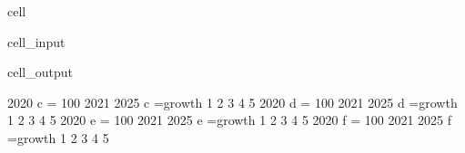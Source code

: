 \documentclass[letterpaper,10pt,english]{jupyterBook}
\begin{document}
\begin{sphinxuseclass}{cell}\begin{sphinxVerbatimInput}

\begin{sphinxuseclass}{cell_input}
\begin{sphinxVerbatim}[commandchars=\\\{\}]
                                 
 \PYG{p}{[}
        \PYG{p}{]}
\end{sphinxVerbatim}

\end{sphinxuseclass}\end{sphinxVerbatimInput}
\begin{sphinxVerbatimOutput}

\begin{sphinxuseclass}{cell_output}
\begin{sphinxVerbatim}[commandchars=\\\{\}]
\PYGZlt{}2020     \PYGZgt{} c = 100 
      \PYGZlt{}2021 2025\PYGZgt{} c =growth 1 2 3 4 5
\PYGZlt{}2020     \PYGZgt{} d = 100 
      \PYGZlt{}2021 2025\PYGZgt{} d =growth 1 2 3 4 5
\PYGZlt{}2020     \PYGZgt{} e = 100 
      \PYGZlt{}2021 2025\PYGZgt{} e =growth 1 2 3 4 5
\PYGZlt{}2020     \PYGZgt{} f = 100 
      \PYGZlt{}2021 2025\PYGZgt{} f =growth 1 2 3 4 5
\end{sphinxVerbatim}

\end{sphinxuseclass}\end{sphinxVerbatimOutput}

\end{sphinxuseclass}
\end{document}

